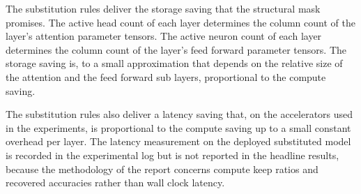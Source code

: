 The substitution rules deliver the storage saving that the structural mask promises. The active head count of each layer determines the column count of the layer's attention parameter tensors. The active neuron count of each layer determines the column count of the layer's feed forward parameter tensors. The storage saving is, to a small approximation that depends on the relative size of the attention and the feed forward sub layers, proportional to the compute saving.

The substitution rules also deliver a latency saving that, on the accelerators used in the experiments, is proportional to the compute saving up to a small constant overhead per layer. The latency measurement on the deployed substituted model is recorded in the experimental log but is not reported in the headline results, because the methodology of the report concerns compute keep ratios and recovered accuracies rather than wall clock latency.
